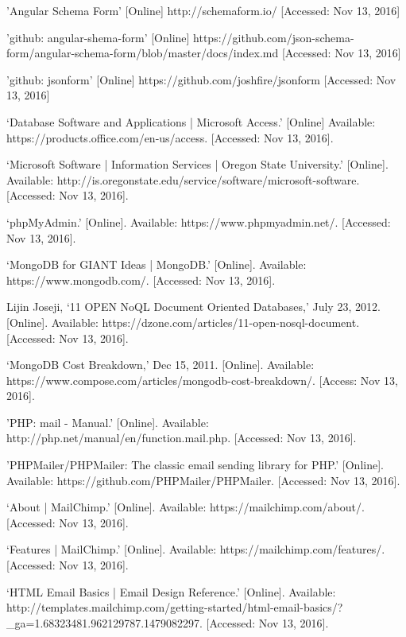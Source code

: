 \documentclass[letterpaper,10pt,serif, draftclsnofoot,onecolumn, compsoc, titlepage]{IEEEtran}
\begin{document}
\begin{thebibliography}{2}
'Angular Schema Form' [Online] http://schemaform.io/ [Accessed: Nov 13, 2016]

'github: angular-shema-form' [Online] https://github.com/json-schema-form/angular-schema-form/blob/master/docs/index.md [Accessed: Nov 13, 2016]

'github: jsonform' [Online] https://github.com/joshfire/jsonform [Accessed: Nov 13, 2016]

`Database Software and Applications | Microsoft Access.' [Online] Available: https://products.office.com/en-us/access. [Accessed: Nov 13, 2016].

`Microsoft Software | Information Services | Oregon State University.' [Online]. Available: http://is.oregonstate.edu/service/software/microsoft-software. [Accessed: Nov 13, 2016].

`phpMyAdmin.' [Online]. Available: https://www.phpmyadmin.net/. [Accessed: Nov 13, 2016].

`MongoDB for GIANT Ideas | MongoDB.' [Online]. Available: https://www.mongodb.com/. [Accessed: Nov 13, 2016].

Lijin Joseji, `11 OPEN NoQL Document Oriented Databases,' July 23, 2012. [Online]. Available: https://dzone.com/articles/11-open-nosql-document. [Accessed: Nov 13, 2016].

`MongoDB Cost Breakdown,' Dec 15, 2011. [Online]. Available: https://www.compose.com/articles/mongodb-cost-breakdown/. [Access: Nov 13, 2016].

'PHP: mail - Manual.' [Online]. Available: http://php.net/manual/en/function.mail.php. [Accessed: Nov 13, 2016].

'PHPMailer/PHPMailer: The classic email sending library for PHP.' [Online]. Available: https://github.com/PHPMailer/PHPMailer. [Accessed: Nov 13, 2016].

`About | MailChimp.' [Online]. Available: https://mailchimp.com/about/. [Accessed: Nov 13, 2016]. 

`Features | MailChimp.' [Online]. Available: https://mailchimp.com/features/. [Accessed: Nov 13, 2016].

`HTML Email Basics | Email Design Reference.' [Online]. Available: http://templates.mailchimp.com/getting-started/html-email-basics/?\_ga=1.68323481.962129787.1479082297. [Accessed: Nov 13, 2016].


\end{thebibliography}
\end{document}
